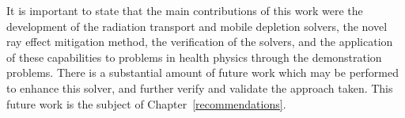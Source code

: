 It is important to state that the main contributions of this work were the development of the radiation transport and mobile depletion solvers, the novel ray effect mitigation method, the verification of the solvers, and the application of these capabilities to problems in health physics through the demonstration problems. There is a substantial amount of future work which may be performed to enhance this solver, and further verify and validate the approach taken. This future work is the subject of Chapter~\ref{recommendations}.